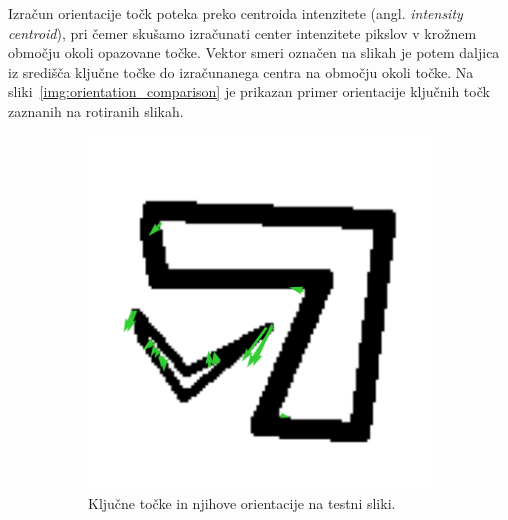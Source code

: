 \documentclass[a4paper,11pt]{article}
\begin{document}
Izračun orientacije točk poteka preko centroida intenzitete (angl. \textit{intensity centroid}), pri čemer skušamo izračunati center intenzitete pikslov v krožnem območju okoli opazovane točke. Vektor smeri označen na slikah je potem daljica iz središča ključne točke do izračunanega centra na območju okoli točke. Na sliki~\ref{img:orientation_comparison} je prikazan primer orientacije ključnih točk zaznanih na rotiranih slikah.
\begin{figure}[hb]
	\centering
	\begin{subfigure}[t]{0.48\textwidth}
		\centering
		\includegraphics[width=\textwidth]{images/orientations_0.png}
		\caption{Ključne točke in njihove orientacije na testni sliki.}
		\label{img:orientations0}
	\end{subfigure}
	\hfill
	\begin{subfigure}[t]{0.48\textwidth}
		\centering

\end{subfigure}
\end{figure}
\end{document}
